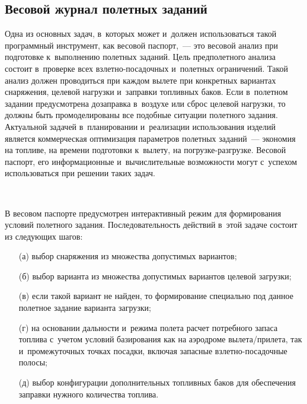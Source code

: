 \begin{multicols}{2}
\vspace*{-6pt}

\section{Весовой журнал полетных заданий}

\vspace*{-2pt}

  Одна из основных задач, в~которых может и~должен использоваться такой 
программный инструмент, как весовой паспорт,~--- это весовой анализ при 
подготовке к~выполнению полетных заданий. Цель предполетного анализа 
состоит в~проверке всех взлетно-посадочных и~полетных ограничений. Такой 
анализ должен проводиться при каждом вылете при конкретных вариантах 
снаряжения, целевой нагрузки и~заправки топливных баков. Если в~полетном 
задании предусмотрена дозаправка в~воздухе или сброс целевой нагрузки, то 
должны быть промоделированы все подобные ситуации полетного задания. 
Актуальной задачей в~планировании и~реализации использования изделий 
является коммерческая оптимизация параметров полетных заданий~--- 
экономия на топливе, на времени подготовки к~вылету, на погрузке-разгрузке. 
Весовой паспорт, его информационные и~вычислительные возможности могут 
с~успехом использоваться при решении таких задач. 

\begin{figure*}[b] %
\vspace*{1pt}
    \begin{center}  
  \mbox{%
 \epsfxsize=128.952mm 
 }
\end{center}
\vspace*{-9pt}
\end{figure*}
  
  В весовом паспорте предусмотрен интерактивный режим для формирования 
условий полетного задания. Последовательность действий в~этой задаче 
состоит из следующих шагов: 
  \begin{itemize}
  \item[(а)] выбор снаряжения из множества допустимых вариантов; 
  \item[(б)] выбор варианта из множества допустимых вариантов целевой 
загрузки; 
  \item[(в)] если такой вариант не найден, то формирование специально под 
данное полетное задание варианта загрузки; 
  \item[(г)] на основании дальности и~режима полета расчет потребного запаса 
топлива с~учетом условий базирования как на аэродроме вылета/прилета, так 
и~промежуточных точках посадки, включая запасные взлет\-но-по\-са\-доч\-ные полосы;
   \item[(д)] выбор конфигурации дополнительных топливных баков для 
обеспечения заправки нужного количества топлива. 
  \end{itemize}
  

\end{multicols}
